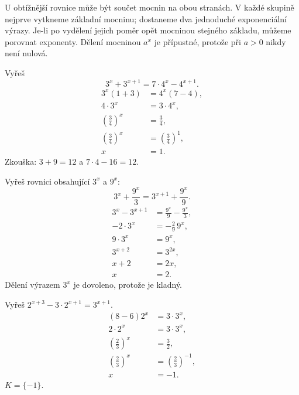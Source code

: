 \documentclass[11pt,a4paper]{article}
\begin{document}
U obtížnější rovnice může být součet mocnin na obou stranách. V každé skupině nejprve vytkneme základní mocninu; dostaneme dva jednoduché exponenciální výrazy. Je-li po vydělení jejich poměr opět mocninou stejného základu, můžeme porovnat exponenty. Dělení mocninou $a^x$ je přípustné, protože při $a>0$ nikdy není nulová.
\begin{prikladReseniBox}[title={Příklad 1}]
Vyřeš
\[
3^x+3^{x+1}=7\cdot4^x-4^{x+1}.
\]
\tcblower
\[
\begin{aligned}
3^x(1+3)&=4^x(7-4),\\
4\cdot3^x&=3\cdot4^x,\\
\left(\frac{3}{4}\right)^x&=\frac{3}{4},\\
\left(\frac{3}{4}\right)^x&=\left(\frac{3}{4}\right)^1,\\
x&=1.
\end{aligned}
\]
Zkouška: $3+9=12$ a $7\cdot4-16=12$.
\end{prikladReseniBox}
\begin{prikladReseniBox}[title={Příklad 2}]
Vyřeš rovnici obsahující $3^x$ a $9^x$:
\[
3^x+\frac{9^x}{3}=3^{x+1}+\frac{9^x}{9}.
\]
\tcblower
\[
\begin{aligned}
3^x-3^{x+1}&=\frac{9^x}{9}-\frac{9^x}{3},\\
-2\cdot3^x&=-\frac{2}{9}\,9^x,\\
9\cdot3^x&=9^x,\\
3^{x+2}&=3^{2x},\\
x+2&=2x,\\
x&=2.
\end{aligned}
\]
Dělení výrazem $3^x$ je dovoleno, protože je kladný.
\end{prikladReseniBox}
\begin{prikladReseniBox}[title={Příklad 3}]
Vyřeš $2^{x+3}-3\cdot2^{x+1}=3^{x+1}$.
\tcblower
\[
\begin{aligned}
(8-6)2^x&=3\cdot3^x,\\
2\cdot2^x&=3\cdot3^x,\\
\left(\frac{2}{3}\right)^x&=\frac{3}{2},\\
\left(\frac{2}{3}\right)^x&=\left(\frac{2}{3}\right)^{-1},\\
x&=-1.
\end{aligned}
\]
$K=\{-1\}$.
\end{prikladReseniBox}
\end{document}
